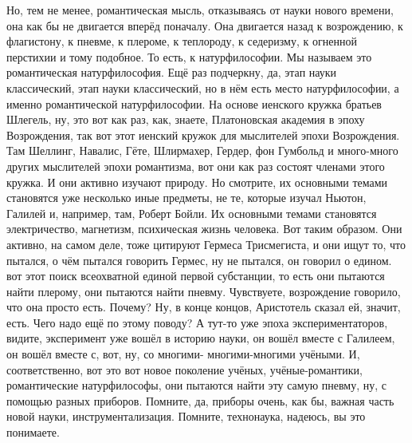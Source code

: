 Но, тем не менее, романтическая
мысль, отказываясь от науки нового времени, она как бы не двигается вперёд
поначалу. Она двигается назад к возрождению, к флагистону, к пневме, к плероме,
к теплороду, к седеризму, к огненной перстихии и тому подобное. То есть, к
натурфилософии. Мы называем это романтическая натурфилософия. Ещё раз подчеркну,
да, этап науки классический, этап науки классический, но в нём есть место
натурфилософии, а именно романтической натурфилософии. На основе иенского кружка
братьев Шлегель, ну, это вот как раз, как, знаете, Платоновская академия в эпоху
Возрождения, так вот этот иенский кружок для мыслителей эпохи Возрождения. Там
Шеллинг, Навалис, Гёте, Шлирмахер, Гердер, фон Гумбольд и много-много других
мыслителей эпохи романтизма, вот они как раз состоят членами этого кружка. И они
активно изучают природу. Но смотрите, их основными темами становятся уже
несколько иные предметы, не те, которые изучал Ньютон, Галилей и, например, там,
Роберт Бойли. Их основными темами становятся электричество, магнетизм,
психическая жизнь человека. Вот таким образом. Они активно, на самом деле, тоже
цитируют Гермеса Трисмегиста, и они ищут то, что пытался, о чём пытался говорить
Гермес, ну не пытался, он говорил о едином. вот этот поиск всеохватной единой
первой субстанции, то есть они пытаются найти плерому, они пытаются найти
пневму. Чувствуете, возрождение говорило, что она просто есть. Почему? Ну, в
конце концов, Аристотель сказал ей, значит, есть. Чего надо ещё по этому поводу?
А тут-то уже эпоха экспериментаторов, видите, эксперимент уже вошёл в историю
науки, он вошёл вместе с Галилеем, он вошёл вместе с, вот, ну, со многими-
многими-многими учёными. И, соответственно, вот это вот новое поколение учёных,
учёные-романтики, романтические натурфилософы, они пытаются найти эту самую
пневму, ну, с помощью разных приборов. Помните, да, приборы очень, как бы,
важная часть новой науки, инструментализация. Помните, технонаука, надеюсь, вы
это понимаете. 

